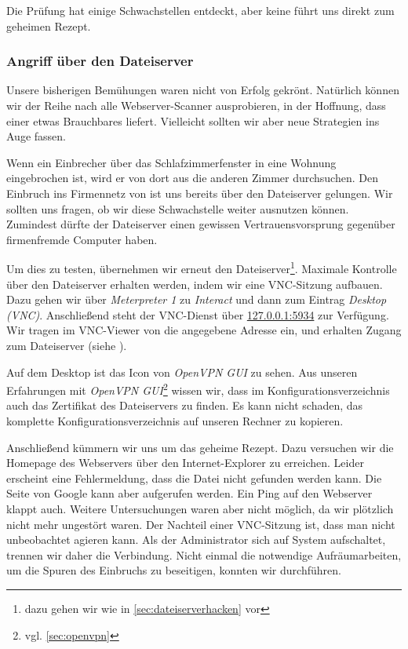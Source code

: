 Die Prüfung hat einige Schwachstellen entdeckt, aber keine führt uns direkt zum geheimen Rezept.


\subsubsection{Angriff über den Dateiserver}

Unsere bisherigen Bemühungen waren nicht von Erfolg gekrönt. Natürlich können wir der Reihe nach alle Webserver-Scanner ausprobieren, in der Hoffnung, dass einer etwas Brauchbares liefert. Vielleicht sollten wir aber neue Strategien ins Auge fassen.

Wenn ein Einbrecher über das Schlafzimmerfenster in eine Wohnung eingebrochen ist, wird er von dort aus die anderen Zimmer durchsuchen. Den Einbruch ins Firmennetz von \Mayerbrot{} ist uns bereits über den Dateiserver gelungen. Wir sollten uns fragen, ob wir diese Schwachstelle weiter ausnutzen können. Zumindest dürfte der Dateiserver einen gewissen Vertrauensvorsprung gegenüber firmenfremde Computer haben. 

Um dies zu testen, übernehmen wir erneut den Dateiserver\footnote{dazu gehen wir wie in \cref{sec:dateiserverhacken} vor}. Maximale Kontrolle über den Dateiserver erhalten werden, indem wir eine VNC-Sitzung aufbauen. Dazu gehen wir über \emph{Meterpreter 1} zu \emph{Interact} und dann zum Eintrag \emph{Desktop (VNC)}. Anschließend steht der VNC-Dienst über \url{127.0.0.1:5934} zur Verfügung. Wir tragen im VNC-Viewer von \Metasploit{} die angegebene Adresse ein, und erhalten Zugang zum Dateiserver (siehe ).


Auf dem Desktop ist das Icon von \emph{OpenVPN GUI} zu sehen. Aus unseren Erfahrungen mit \emph{OpenVPN GUI}\footnote{vgl. \cref{sec:openvpn}} wissen wir, dass im Konfigurationsverzeichnis auch das Zertifikat des Dateiservers zu finden. Es kann nicht schaden, das komplette Konfigurationsverzeichnis auf unseren Rechner zu kopieren.

Anschließend kümmern wir uns um das geheime Rezept. Dazu versuchen wir die Homepage des Webservers über den Internet-Explorer zu erreichen. Leider erscheint eine Fehlermeldung, dass die Datei nicht gefunden werden kann. Die Seite von Google kann aber aufgerufen werden. Ein Ping auf den Webserver klappt auch. Weitere Untersuchungen waren aber nicht möglich, da wir plötzlich nicht mehr ungestört waren. Der Nachteil einer VNC-Sitzung ist, dass man nicht unbeobachtet agieren kann. Als der Administrator sich auf System aufschaltet, trennen wir daher die Verbindung. Nicht einmal die notwendige Aufräumarbeiten, um die Spuren des Einbruchs zu beseitigen, konnten wir durchführen.

